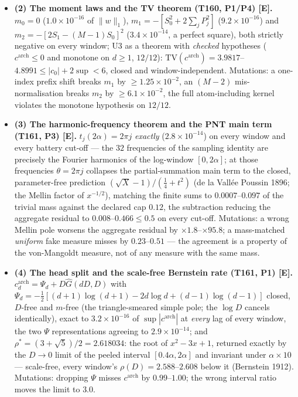 \documentclass[11pt]{article}
\providecommand{\mE}{\textbf{[E]}}\providecommand{\mC}{\textbf{[C]}}
\begin{document}
\begin{itemize}[leftmargin=1.5em]
\item \textbf{(2) The moment laws and the TV theorem (T160, P1/P4) \mE.} $m_0=0$
($1.0\times10^{-16}$ of $\|w\|_1$), $m_1=-[S_0^2+2\sum_jP_j^2]$ ($9.2\times10^{-16}$)
and $m_2=-[2S_1-(M{-}1)S_0]^2$ ($3.4\times10^{-14}$, a perfect square), both strictly
negative on every window; U3 as a theorem with \emph{checked} hypotheses
($c^{\mathrm{arch}}\le0$ and monotone on $d\ge1$, $12/12$):
$\mathrm{TV}(c^{\mathrm{arch}})=3.9817$--$4.8991\le|c_0|+2\sup<6$, closed and
window-independent. Mutations: a one-index prefix shift breaks $m_1$ by
$\ge1.25\times10^{-2}$, an $(M{-}2)$ mis-normalisation breaks $m_2$ by
$\ge6.1\times10^{-2}$, the full atom-including kernel violates the monotone hypothesis
on $12/12$.
\item \textbf{(3) The harmonic-frequency theorem and the PNT main term (T161, P3) \mE.}
$t_j(2\alpha)=2\pi j$ \emph{exactly} ($2.8\times10^{-14}$) on every window and every
battery cut-off --- the $32$ frequencies of the sampling identity are precisely the
Fourier harmonics of the log-window $[0,2\alpha]$; at those frequencies
$\theta=2\pi j$ collapses the partial-summation main term to the closed, parameter-free
prediction $(\sqrt X-1)/(\tfrac14+t^2)$ (de la Vall\'ee Poussin 1896; the Mellin factor
of $x^{-1/2}$), matching the finite sums to $0.0007$--$0.097$ of the trivial mass
against the declared cap $0.12$, the subtraction reducing the aggregate residual to
$0.008$--$0.466\le0.5$ on every cut-off. Mutations: a wrong Mellin pole worsens the
aggregate residual by $\times1.8$--$\times95.8$; a mass-matched \emph{uniform} fake
measure misses by $0.23$--$0.51$ --- the agreement is a property of the von-Mangoldt
measure, not of any measure with the same mass.
\item \textbf{(4) The head split and the scale-free Bernstein rate (T161, P1) \mE.}
$c^{\mathrm{arch}}_d=\Psi_d+D\widehat G(dD,D)$ with
$\Psi_d=-\tfrac12[(d{+}1)\log(d{+}1)-2d\log d+(d{-}1)\log(d{-}1)]$ closed, $D$-free and
$m$-free (the triangle-smeared simple pole; the $\log D$ cancels identically), exact to
$3.2\times10^{-16}$ of $\sup|c^{\mathrm{arch}}|$ at \emph{every} lag of every window,
the two $\Psi$ representations agreeing to $2.9\times10^{-14}$; and
$\rho^*=(3+\sqrt5)/2=2.618034$: the root of $x^2-3x+1$, returned exactly by the $D\to0$
limit of the peeled interval $[0.4\alpha,2\alpha]$ and invariant under
$\alpha\times10$ --- scale-free, every window's $\rho(D)=2.588$--$2.608$ below it
(Bernstein 1912). Mutations: dropping $\Psi$ misses $c^{\mathrm{arch}}$ by
$0.99$--$1.00$; the wrong interval ratio moves the limit to $3.0$.

\end{itemize}
\end{document}
